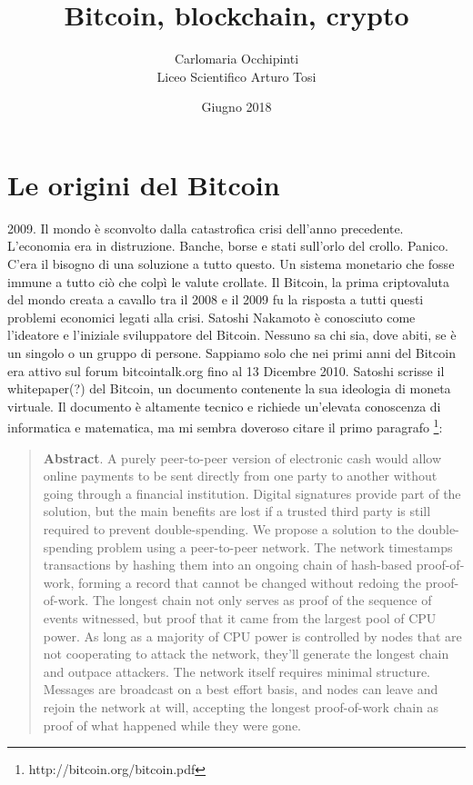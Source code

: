 \documentclass {article}
\title {{\Huge Bitcoin, blockchain, crypto}}
\author {Carlomaria Occhipinti\\Liceo Scientifico Arturo Tosi}
\date {Giugno 2018}
\begin{document}
\maketitle


\newpage

\tableofcontents


\newpage


\section {Le origini del Bitcoin}


2009. Il mondo è sconvolto dalla catastrofica crisi dell'anno precedente.
L'economia era in distruzione. Banche, borse e stati sull'orlo del crollo. Panico.
C'era il bisogno di una soluzione a tutto questo. Un sistema monetario che fosse immune a tutto ciò che colpì le valute crollate. Il Bitcoin, la prima criptovaluta del mondo creata a cavallo tra il 2008 e il 2009 fu la risposta a tutti questi problemi economici legati alla crisi.
Satoshi Nakamoto è conosciuto come l'ideatore e l'iniziale sviluppatore del Bitcoin. Nessuno sa chi sia, dove abiti, se è un singolo o un gruppo di persone. Sappiamo solo che nei primi anni del Bitcoin era attivo sul forum bitcointalk.org fino al 13 Dicembre 2010.
Satoshi scrisse il whitepaper(?) del Bitcoin, un documento contenente la sua ideologia di moneta virtuale. Il documento è altamente tecnico e richiede un'elevata conoscenza di informatica e matematica, ma mi sembra doveroso citare il primo paragrafo \footnote{http://bitcoin.org/bitcoin.pdf}:\\

\begin {quote}

\textbf {Abstract}. A purely peer-to-peer version of electronic cash would allow online payments to be sent directly from one party to another without going through a financial institution. Digital signatures provide part of the solution, but the main benefits are lost if a trusted third party is still required to prevent double-spending. We propose a solution to the double-spending problem using a peer-to-peer network. The network timestamps transactions by hashing them into an ongoing chain of hash-based proof-of-work, forming a record that cannot be changed without redoing the proof-of-work. The longest chain not only serves as proof of the sequence of events witnessed, but proof that it came from the largest pool of CPU power. As long as a majority of CPU power is controlled by nodes that are not cooperating to attack the network, they'll generate the longest chain and outpace attackers. The network itself requires minimal structure. Messages are broadcast on a best effort basis, and nodes can leave and rejoin the network at will, accepting the longest proof-of-work chain as proof of what happened while they were gone.

\end {quote}
\end{document}
